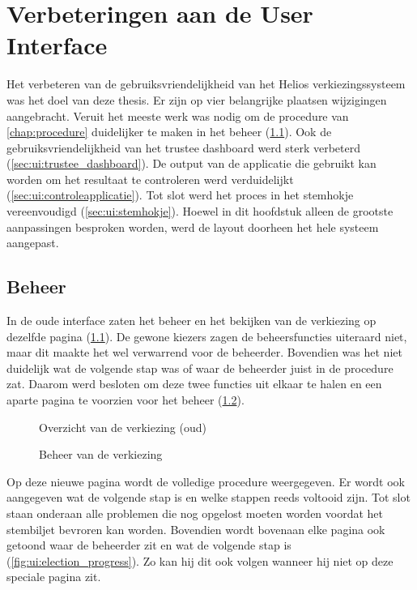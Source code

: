% 
%

\chapter{Verbeteringen aan de User Interface}
\label{chap:interface}

Het verbeteren van de gebruiksvriendelijkheid van het Helios verkiezingssysteem was het doel van deze thesis. Er zijn op vier belangrijke plaatsen wijzigingen aangebracht. Veruit het meeste werk was nodig om de procedure van \ref{chap:procedure} duidelijker te maken in het beheer (\ref{sec:ui:beheer}). Ook de gebruiksvriendelijkheid van het trustee dashboard werd sterk verbeterd (\ref{sec:ui:trustee_dashboard}). De output van de applicatie die gebruikt kan worden om het resultaat te controleren werd verduidelijkt (\ref{sec:ui:controleapplicatie}). Tot slot werd het proces in het stemhokje vereenvoudigd (\ref{sec:ui:stemhokje}). Hoewel in dit hoofdstuk alleen de grootste aanpassingen besproken worden, werd de layout doorheen het hele systeem aangepast.

\section{Beheer}
\label{sec:ui:beheer}

In de oude interface zaten het beheer en het bekijken van de verkiezing op dezelfde pagina (\ref{fig:ui:elections_view_old}). De gewone kiezers zagen de beheersfuncties uiteraard niet, maar dit maakte het wel verwarrend voor de beheerder. Bovendien was het niet duidelijk wat de volgende stap was of waar de beheerder juist in de procedure zat. Daarom werd besloten om deze twee functies uit elkaar te halen en een aparte pagina te voorzien voor het beheer (\ref{fig:ui:elections_admin}).

\begin{figure}
  \caption{Overzicht van de verkiezing (oud)}
  \label{fig:ui:elections_view_old}
\end{figure}

\begin{figure}
  \caption{Beheer van de verkiezing}
  \label{fig:ui:elections_admin}
\end{figure}

\npar Op deze nieuwe pagina wordt de volledige procedure weergegeven. Er wordt ook aangegeven wat de volgende stap is en welke stappen reeds voltooid zijn. Tot slot staan onderaan alle problemen die nog opgelost moeten worden voordat het stembiljet bevroren kan worden. Bovendien wordt bovenaan elke pagina ook getoond waar de beheerder zit en wat de volgende stap is (\ref{fig:ui:election_progress}). Zo kan hij dit ook volgen wanneer hij niet op deze speciale pagina zit.


